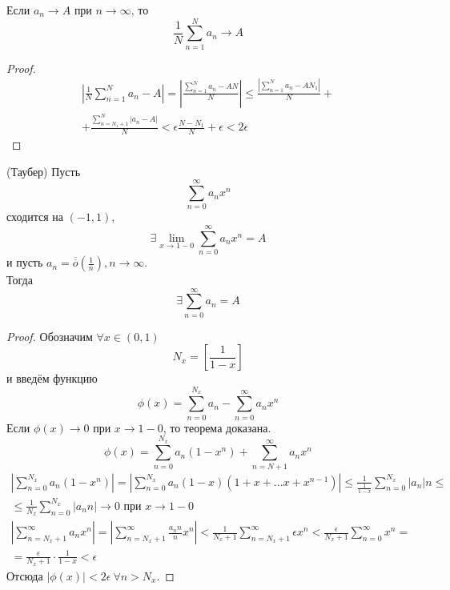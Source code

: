 \begin{lemma}
    Если $a_n \rightarrow A$ при $n \rightarrow \infty$, то
    \[\frac{1}{N}\sum_{n=1}^{N}a_n \rightarrow A\]
\end{lemma}
\begin{proof}
    \begin{multline*}
        \left|\frac{1}{N}\sum_{n=1}^{N}a_n - A\right| = \left|\frac{\sum_{n=1}^{N}a_n - AN}{N}\right| \leqslant \frac{|\sum_{n=1}^{N}a_n - AN_1|}{N} + \\ +\frac{\sum_{n=N_1+1}^{N}|a_n - A|}{N} < \epsilon\frac{N-N_1}{N} + \epsilon < 2\epsilon
    \end{multline*}
\end{proof}
\begin{theorem}(Таубер)
    Пусть
    \[\sum_{n=0}^{\infty}a_n x^n\]
    сходится на $(-1, 1)$,
    \[\exists \lim \limits_{x\rightarrow 1-0} \sum_{n=0}^{\infty}a_n x^n = A\]
    и пусть $a_n = \overline{\overline{o}}(\frac{1}{n}), n \rightarrow \infty$.\\
    Тогда 
    \[\exists \sum_{n=0}^{\infty}a_n = A\]
\end{theorem}
\begin{proof}
    Обозначим $\forall x \in (0, 1)$
    \[N_x = \left[\frac{1}{1-x}\right]\]
    и введём функцию
    \[\phi(x) = \sum_{n=0}^{N_x}a_n - \sum_{n=0}^{\infty}a_n x^n\]
    Если $\phi(x) \rightarrow 0$ при $x \rightarrow 1-0$, то теорема доказана.
    \[\phi(x) = \sum_{n=0}^{N_x}a_n(1-x^n) + \sum_{n=N+1}^{\infty}a_n x^n\]
    \begin{multline*}
        \left|\sum_{n=0}^{N_x}a_n(1-x^n)\right| = \left|\sum_{n=0}^{N_x}a_n(1-x)(1+x+...x+x^{n-1})\right| \leqslant \frac{1}{\frac{1}{1-x}}\sum_{n=0}^{N_x}|a_n|n \leqslant \\ \leqslant \frac{1}{N_x}\sum_{n=0}^{N_x}|a_nn| \rightarrow 0 \text{ при } x \rightarrow 1-0
    \end{multline*}
    \begin{multline*}
        \left|\sum_{n=N_x+1}^{\infty}a_n x^n\right| = \left|\sum_{n=N_x+1}^{\infty}\frac{a_n n}{n} x^n \right| < \frac{1}{N_x + 1}\sum_{n=N_x+1}^{\infty}\epsilon x^n < \frac{\epsilon}{N_x + 1}\sum_{n=0}^{\infty}x^n =\\= \frac{\epsilon}{N_x + 1} \cdot \frac{1}{1-x} < \epsilon
    \end{multline*}
    Отсюда $|\phi(x)| < 2\epsilon \ \forall n > N_x$.
\end{proof}
